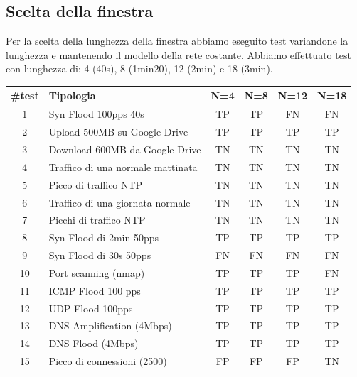\subsection{Scelta della finestra}

Per la scelta della lunghezza della finestra abbiamo eseguito test variandone la lunghezza e mantenendo il modello della rete costante.
Abbiamo effettuato test con lunghezza di: 4 (40s), 8 (1min20), 12 (2min) e 18 (3min).

\FloatBarrier
\begin{table}
    \begin{tabularx}{\textwidth}{||c X c c c c||} 
        \hline
        \#test & Tipologia & N=4 & N=8 & N=12 & N=18\\ [0.5ex] 
        \hline\hline
        1 & Syn Flood 100pps 40s & TP & TP & \cellcolor{magenta} FN & \cellcolor{magenta} FN\\ 
        \hline
        2 & Upload 500MB su Google Drive & TP & TP & TP & TP\\ 
        \hline
        3 &  Download 600MB da Google Drive & TN  & TN & TN & TN\\ 
        \hline 
        4 & Traffico di una normale mattinata & TN & TN & TN & TN\\
        \hline
        5 & Picco di traffico NTP & TN & TN & TN & TN\\
        \hline
        6 & Traffico di una giornata normale & TN & TN & TN & TN\\ 
        \hline
        7 & Picchi di traffico NTP & TN & TN & TN & TN\\ 
        \hline 
        8 & Syn Flood di 2min 50pps & TP & TP & TP & TP\\
        \hline
        9 & Syn Flood di 30s 50pps & \cellcolor{magenta} FN & \cellcolor{magenta} FN & \cellcolor{magenta} FN & \cellcolor{magenta} FN\\        
        \hline
        10 & Port scanning (nmap) & TP & TP & TP & \cellcolor{magenta} FN\\
        \hline
        11 & ICMP Flood 100 pps & TP & TP & TP & TP\\
        \hline
        12 & UDP Flood 100pps & TP & TP & TP & TP\\ 
        \hline
        13 & DNS Amplification (4Mbps) & TP & TP & TP & TP\\ 
        \hline 
        14 & DNS Flood (4Mbps) & TP & TP & TP & TP\\
        \hline
        15 & Picco di connessioni (2500) & \cellcolor{orange} FP & \cellcolor{orange} FP & \cellcolor{orange} FP & TN \\        

\end{tabularx}
\end{table}
